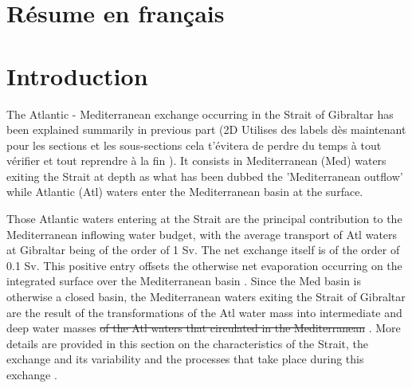 \hypersetup{pdfborder=0 0 0}




\section{Résume en français}



\section{Introduction}

The Atlantic - Mediterranean exchange occurring in the Strait of Gibraltar has been explained summarily in previous part (2D \color{blue} Utilises des labels dès maintenant pour les sections et les sous-sections cela t'évitera de perdre du temps à tout vérifier et tout reprendre à la fin \color{black}). It consists in \color{blue} Mediterranean (Med) \color{black} waters exiting the Strait at depth as what has been dubbed the 'Mediterranean outflow' while \color{blue}Atlantic (Atl) \color{black} waters enter the Mediterranean basin at the surface.

Those Atlantic waters entering at the Strait are the principal contribution to the Mediterranean inflowing water budget, with the average transport of Atl waters at \color{blue}Gibraltar \color{black} being of the order of 1 Sv. The net exchange itself is of the order of 0.1 Sv. \color{blue} This positive entry offsets the otherwise net evaporation occurring on the integrated surface \color{blue}over \color{black} the Mediterranean basin \citep{bryden_1994}.
Since the Med basin is otherwise a closed basin, the Mediterranean waters exiting the Strait of Gibraltar are the result of the transformations \color{blue} of the Atl water mass \color{black} into intermediate and deep water masses\color{blue}\sout{ of the Atl waters that circulated in the Mediterranean} \color{black}.
More details are provided in this section on the characteristics of the Strait, the exchange and its variability and the processes that take place during \color{blue}this exchange \color{black}.






